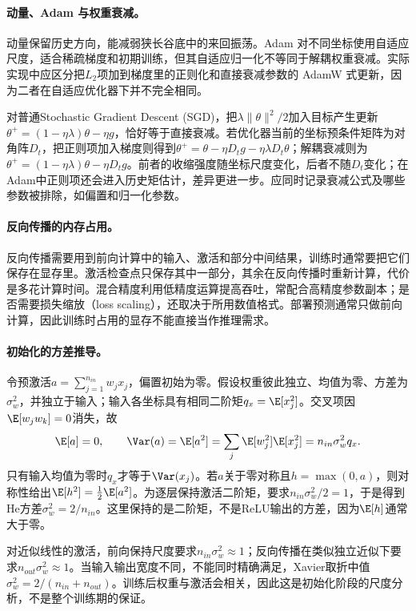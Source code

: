\paragraph{动量、Adam 与权重衰减。}
动量保留历史方向，能减弱狭长谷底中的来回振荡。Adam 对不同坐标使用自适应尺度，适合稀疏梯度和初期训练，但其自适应归一化不等同于解耦权重衰减。实际实现中应区分把$L_2$项加到梯度里的正则化和直接衰减参数的 AdamW 式更新，因为二者在自适应优化器下并不完全相同。

对普通Stochastic Gradient Descent (SGD)，把$\lambda\|\theta\|^2/2$加入目标产生更新$\theta^+=(1-\eta\lambda)\theta-\eta g$，恰好等于直接衰减。若优化器当前的坐标预条件矩阵为对角阵$D_t$，把正则项加入梯度则得到$\theta^+=\theta-\eta D_tg-\eta\lambda D_t\theta$；解耦衰减则为$\theta^+=(1-\eta\lambda)\theta-\eta D_tg$。前者的收缩强度随坐标尺度变化，后者不随$D_t$变化；在Adam中正则项还会进入历史矩估计，差异更进一步。应同时记录衰减公式及哪些参数被排除，如偏置和归一化参数。

\paragraph{反向传播的内存占用。}
反向传播需要用到前向计算中的输入、激活和部分中间结果，训练时通常要把它们保存在显存里。激活检查点只保存其中一部分，其余在反向传播时重新计算，代价是多花计算时间。混合精度利用低精度运算提高吞吐，常配合高精度参数副本；是否需要损失缩放（loss scaling），还取决于所用数值格式。部署预测通常只做前向计算，因此训练时占用的显存不能直接当作推理需求。

\paragraph{初始化的方差推导。}
令预激活$a=\sum_{j=1}^{n_{in}}w_jx_j$，偏置初始为零。假设权重彼此独立、均值为零、方差为$\sigma_w^2$，并独立于输入；输入各坐标具有相同二阶矩$q_x=\E[x_j^2]$。交叉项因$\E[w_jw_k]=0$消失，故
\begin{equation}
 \E[a]=0,\qquad \Var(a)=\E[a^2]
 =\sum_j\E[w_j^2]\E[x_j^2]=n_{in}\sigma_w^2q_x.
\end{equation}
只有输入均值为零时$q_x$才等于$\Var(x_j)$。若$a$关于零对称且$h=\max(0,a)$，则对称性给出$\E[h^2]=\tfrac12\E[a^2]$。为逐层保持激活二阶矩，要求$n_{in}\sigma_w^2/2=1$，于是得到He方差$\sigma_w^2=2/n_{in}$。这里保持的是二阶矩，不是ReLU输出的方差，因为$\E[h]$通常大于零。

对近似线性的激活，前向保持尺度要求$n_{in}\sigma_w^2\approx1$；反向传播在类似独立近似下要求$n_{out}\sigma_w^2\approx1$。当输入输出宽度不同，不能同时精确满足，Xavier取折中值$\sigma_w^2=2/(n_{in}+n_{out})$。训练后权重与激活会相关，因此这是初始化阶段的尺度分析，不是整个训练期的保证。

